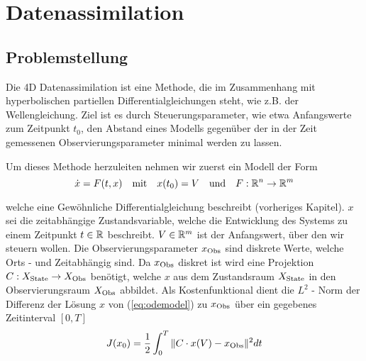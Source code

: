 \chapter{Datenassimilation}
\section{Problemstellung}
Die 4D Datenassimilation ist eine Methode, die im Zusammenhang mit hyperbolischen partiellen Differentialgleichungen steht, wie z.B. der Wellengleichung. Ziel ist es durch Steuerungsparameter, wie etwa Anfangswerte zum Zeitpunkt $t_0$, den Abstand eines Modells gegenüber der in der Zeit gemessenen Observierungsparameter minimal werden zu lassen. 

Um dieses Methode herzuleiten nehmen wir zuerst ein Modell der Form
\begin{equation}\label{eq:odemodel}
 \dot{x} = F(t,x)\quad \text{mit} \quad x(t_0) = V \quad \text{und}\quad F:\mathbb{R}^n\to \mathbb{R}^m
\end{equation}
  
welche eine Gewöhnliche Differentialgleichung beschreibt (vorheriges Kapitel). $x$ sei die zeitabhängige Zustandsvariable, welche die Entwicklung des Systems zu einem Zeitpunkt $t\in \mathbb{R}$ beschreibt. 
$V \in \mathbb{R}^m$ ist der Anfangswert, über den wir steuern wollen.
Die Observierungsparameter $x_{\text{Obs}}$ sind diskrete Werte, welche Orts - und Zeitabhängig sind. Da $x_{\text{Obs}}$ diskret ist wird eine Projektion $C:X_{\text{State}}\to X_{\text{Obs}}$ benötigt, welche $x$ aus dem Zustandsraum $X_{\text{State}}$ in den Observierungsraum $X_{\text{Obs}}$ abbildet. 
Als Kostenfunktional dient die $L^2$ - Norm der Differenz der Lösung $x$ von (\ref{eq:odemodel}) zu $x_{\text{Obs}}$ über ein gegebenes Zeitinterval $[0,T]$
\begin{equation}
 J(x_0) = \frac{1}{2}\int_0^T \|C\cdot x(V)-x_{\text{Obs}}\|^2dt
\end{equation}